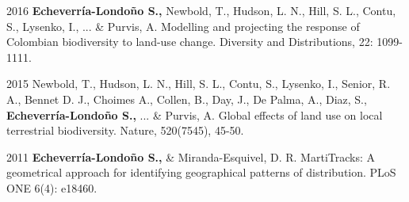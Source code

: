 \documentclass[letterpaper]{twentysecondcv} %
\begin{document}
2016 \textbf{Echeverr\'ia-Londo\~no S.,} Newbold, T., Hudson, L. N., Hill, S. L., Contu, S., Lysenko, I., ... \& Purvis, A. Modelling and projecting the response of Colombian biodiversity to land-use change. Diversity and Distributions, 22: 1099-1111.

2015 Newbold, T., Hudson, L. N., Hill, S. L., Contu, S., Lysenko, I., Senior, R. A., Bennet D. J., Choimes A., Collen, B., Day, J., De Palma, A., Diaz, S., \textbf{Echeverr\'ia-Londo\~no S.,} ... \& Purvis, A. Global effects of land use on local terrestrial biodiversity. Nature, 520(7545), 45-50.

2011 \textbf{Echeverr\'ia-Londo\~no S., }\& Miranda-Esquivel, D. R. MartiTracks: A geometrical approach for identifying geographical patterns of distribution. PLoS ONE 6(4): e18460.
\end{document}
